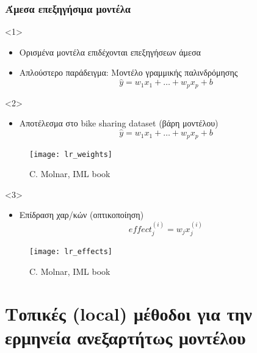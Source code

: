 \begin{frame}
  \frametitle{Άμεσα επεξηγήσιμα μοντέλα}
  \begin{onlyenv}<1>
    \begin{itemize}
    \item Ορισμένα μοντέλα επιδέχονται επεξηγήσεων άμεσα
    \item Απλούστερο παράδειγμα: Μοντέλο γραμμικής παλινδρόμησης
      \begin{equation*}
        \hat{y} = w_1x_1 + \dotsc + w_px_p + b
      \end{equation*}
    \end{itemize}
  \end{onlyenv}
  \begin{onlyenv}<2>
    \begin{itemize}
    \item Αποτέλεσμα στο bike sharing dataset (βάρη μοντέλου)
      \begin{equation*}
        \hat{y} = w_1x_1 + \dotsc + w_px_p + b
      \end{equation*}
    \end{itemize}
    \begin{center}
      \begin{figure}
        \texttt{[image: lr\_weights]}
        \caption{\footnotesize C. Molnar, IML book}
      \end{figure}
    \end{center}
  \end{onlyenv}
  \begin{onlyenv}<3>
    \begin{itemize}
    \item Επίδραση χαρ/κών (οπτικοποίηση)
      \begin{equation}
        effect_j^{(i)} = w_jx_j^{(i)}
      \end{equation}
    \end{itemize}
    \begin{center}
      \begin{figure}
        \texttt{[image: lr\_effects]}
        \caption{\footnotesize C. Molnar, IML book}
      \end{figure}
    \end{center}
  \end{onlyenv}
\end{frame}

\section{Τοπικές (local) μέθοδοι για την ερμηνεία ανεξαρτήτως μοντέλου}

